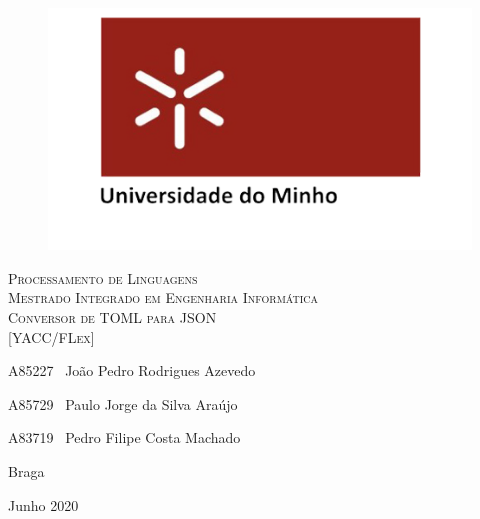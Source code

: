 \documentclass[a4paper,12pt]{report}
\begin{document}


\begin{titlepage}
    \center
    {

    \begin{figure}[t]
        \centering
        \includegraphics[scale=0.4]{images/uminho.png}
        \label{img:logo}
        \vspace{2.0cm}
    \end{figure}

    \vspace{3.0cm}
    \textsc{\Huge Processamento de Linguagens}\\[0.5cm]
    \textsc{\Large{Mestrado Integrado em Engenharia Informática}}\\[0.5cm]
    \vspace{3cm}
    \textsc{\huge{Conversor de TOML para JSON}}\\[1cm]
    \textsc{\large{[YACC/FLex]}}\\[0.5cm]
    \vspace{4cm}
    \begin{flushleft}

        \vspace{1cm}
        \large 
        \vspace{0.5cm}

        \large A85227 \,\,\,João Pedro Rodrigues Azevedo
        \vspace{0.2cm}

        A85729 \,\,\,Paulo Jorge da Silva Araújo
        \vspace{0.2cm}

        A83719 \,\,\,Pedro Filipe Costa Machado
        \vspace{0.2cm}

    \end{flushleft}
    \begin{flushright}
        Braga

        Junho 2020
    \end{flushright}

\date{\today}
}
\end{titlepage}
\end{document}
